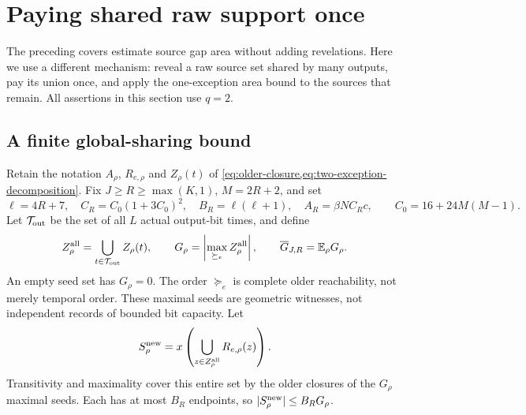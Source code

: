 \section{Paying shared raw support once}\label{sec:shared-support}

The preceding covers estimate source gap area without adding revelations.
Here we use a different mechanism: reveal a raw source set shared by many
outputs, pay its union once, and apply the one-exception area bound to
the sources that remain. All assertions in this section use $q=2$.

\subsection{A finite global-sharing bound}

Retain the notation $A_\rho$, $R_{e,\rho}$ and $Z_\rho(t)$ of
\cref{eq:older-closure,eq:two-exception-decomposition}. Fix
$J\ge R\ge\max(K,1)$, $M=2R+2$, and set
\begin{equation}\label{eq:sharing-constants}
 \ell=4R+7,\quad C_R=C_0(1+3C_0)^2,\quad
 B_R=\ell(\ell+1),\quad A_R=\beta NC_Rc,
 \qquad C_0=16+24M(M-1).
\end{equation}
Let $\mathcal T_{\rm out}$ be the set of all $L$ actual output-bit times,
and define
\[
 Z_\rho^{\rm all}=\bigcup_{t\in\mathcal T_{\rm out}}Z_\rho(t),\qquad
 G_\rho=\left|\max_{\succeq_e}Z_\rho^{\rm all}\right|,\qquad
 \overline G_{J,R}=\mathbb E_\rho G_\rho.
\]
An empty seed set has $G_\rho=0$. The order $\succeq_e$ is complete
older reachability, not merely temporal order. These maximal seeds are
geometric witnesses, not independent records of bounded bit capacity.
Let
\begin{equation}\label{eq:global-newer-support}
 S^{\rm new}_\rho
 =x\left(\bigcup_{z\in Z_\rho^{\rm all}}R_{e,\rho}(z)\right).
\end{equation}
Transitivity and maximality cover this entire set by the older closures
of the $G_\rho$ maximal seeds. Each has at most $B_R$ endpoints, so
$|S^{\rm new}_\rho|\le B_RG_\rho$.

